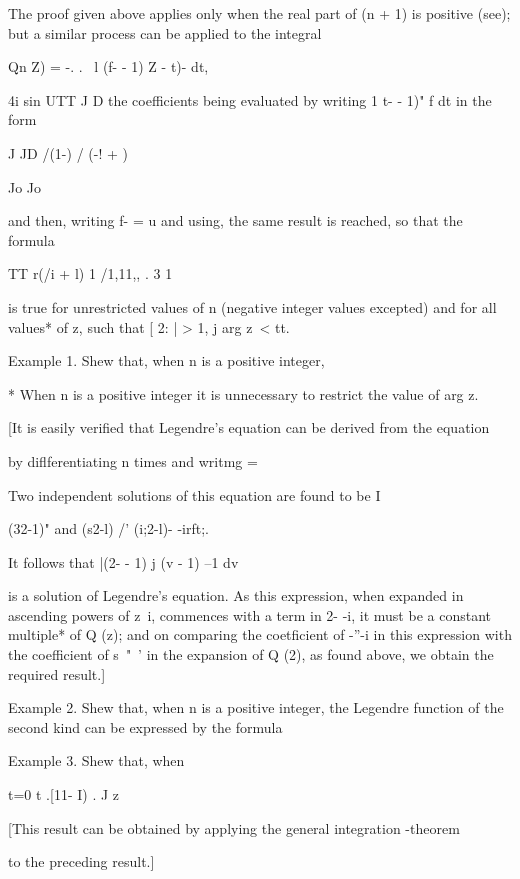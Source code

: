 {{The proof given above applies only when the real part of (n + 1) is
positive (see); but a similar process can be applied to the
integral

Qn Z) = -. . \ l (f- - 1) Z - t)- dt,

4i sin UTT J D the coefficients being evaluated by writing 1 t- - 1)"
f dt in the form

J JD /(1-) / (-! + )

Jo Jo

and then, writing f- = u and using, the same result is
reached, so that the formula

TT r(/i + l) 1 /1,11,, . 3 1

is true for unrestricted values of n (negative integer values
excepted) and for all values* of z, such that [ 2: | > 1, j arg z\ <
tt.

Example 1. Shew that, when n is a positive integer,

* When n is a positive integer it is unnecessary to restrict the value
of arg z.

%
%

[It is easily verified that Legendre's equation can be derived from
the equation

by diflferentiating n times and writmg = 

Two independent solutions of this equation are found to be I

(32-1)" and (s2-l) /' (i;2-l)- -irft;.

It follows that |(2- - 1) j (v - 1) --1 dv

is a solution of Legendre's equation. As this expression, when
expanded in ascending powers of z~i, commences with a term in 2- -i,
it must be a constant multiple* of Q (z); and on comparing the
coetficient of -''-i in this expression with the coefficient of s~"~'
in the expansion of Q (2), as found above, we obtain the required
result.]

Example 2. Shew that, when n is a positive integer, the Legendre
function of the second kind can be expressed by the formula

Example 3. Shew that, when %

t=0 t .[11- I) . J z

[This result can be obtained by applying the general integration
-theorem

to the preceding result.]


}}
